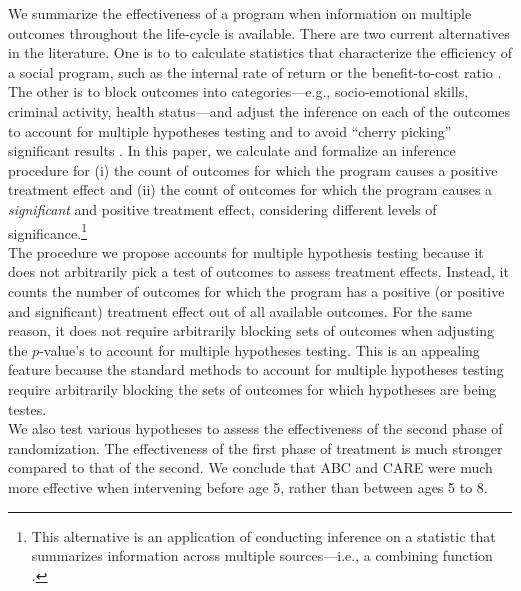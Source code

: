 \noindent We summarize the effectiveness of a program when information on multiple outcomes throughout the life-cycle is available. There are two current alternatives in the literature. One is to to calculate statistics that characterize the efficiency of a social program, such as the internal rate of return or the benefit-to-cost ratio \citep{Heckman_Moon_etal_2010_RateofReturn}. The other is to block outcomes into categories---e.g., socio-emotional skills, criminal activity, health status---and adjust the inference on each of the outcomes to account for multiple hypotheses testing and to avoid ``cherry picking'' significant results \citep{Lehman_Romano_2005_AnnStat,Lehmann_Romano_2005_testing,Heckman_Moon_etal_2010_QE}. In this paper, we calculate and formalize an inference procedure for (i) the count of outcomes for which the program causes a positive treatment effect and (ii) the count of outcomes for which the program causes a \emph{significant} and positive treatment effect, considering different levels of significance.\footnote{This alternative is an application of conducting inference on a statistic that summarizes information across multiple sources---i.e., a combining function \citep{Pesarin_Salmaso_2010_PermutationTests}.}\\

\noindent The procedure we propose accounts for multiple hypothesis testing because it does not arbitrarily pick a test of outcomes to assess treatment effects. Instead, it counts the number of outcomes for which the program has a positive (or positive and significant) treatment effect out of all available outcomes. For the same reason, it does not require arbitrarily blocking sets of outcomes when adjusting the $p$-value's to account for multiple hypotheses testing. This is an appealing feature because the standard methods to account for multiple hypotheses testing require arbitrarily blocking the sets of outcomes for which hypotheses are being testes.\\

\noindent We also test various hypotheses to assess the effectiveness of the second phase of randomization. The effectiveness of the first phase of treatment is much stronger compared to that of the second. We conclude that ABC and CARE were much more effective when intervening before age 5, rather than between ages 5 to 8.\\

